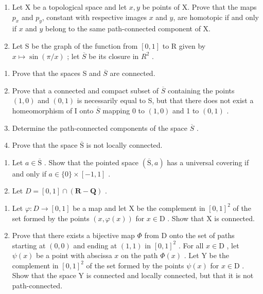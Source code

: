 \exercisegroup

\begin{enumerate}
\def\labelenumi{\arabic{enumi})}
\item
  Let X be a topological space and let \(x, y\) be points of X. Prove that the maps \(p_x\) and \(p_y\), constant with respective images \(x\) and \(y\), are homotopic if and only if \(x\) and \(y\) belong to the same path-connected component of X.
\item
  Let S be the graph of the function from \([0,1]\) to R given by \(x \mapsto \sin(\pi/x)\) ; let \(\overline{S}\) be its closure in \(R^{2}\) .
\end{enumerate}

\begin{enumerate}
\def\labelenumi{\alph{enumi})}
\item
  Prove that the spaces S and \(\overline{S}\) are connected.
\item
  Prove that a connected and compact subset of \(\overline{S}\) containing the points \((1,0)\) and \((0,1)\) is necessarily equal to S, but that there does not exist a homeomorphism of I onto \(\overline{S}\) mapping 0 to \((1,0)\) and 1 to \((0,1)\) .
\item
  Determine the path-connected components of the space \(\overline{S}\) .
\item
  Prove that the space \(\overline{\mathrm{S}}\) is not locally connected.
\end{enumerate}

\begin{enumerate}
\def\labelenumi{\arabic{enumi})}
\setcounter{enumi}{2}
\item
  Let \(a \in \overline{\mathrm{S}}\) . Show that the pointed space \((\overline{\mathrm{S}}, a)\) has a universal covering if and only if \(a \in \{0\} \times [-1, 1]\) .
\item
  Let \(D = [0, 1] \cap (\mathbf{R} - \mathbf{Q})\) .
\end{enumerate}

\begin{enumerate}
\def\labelenumi{\alph{enumi})}
\item
  Let \(\varphi\colon D \to [0,1]\) be a map and let X be the complement in \([0,1]^2\) of the set formed by the points \((x,\varphi(x))\) for \(x\in\mathrm{D}\) . Show that X is connected.
\item
  Prove that there exists a bijective map \(\Phi\) from D onto the set of paths starting at \((0,0)\) and ending at \((1,1)\) in \([0,1]^2\) . For all \(x \in \mathrm{D}\) , let \(\psi(x)\) be a point with abscissa \(x\) on the path \(\Phi(x)\) . Let Y be the complement in \([0,1]^2\) of the set formed by the points \(\psi(x)\) for \(x \in \mathrm{D}\) . Show that the space Y is connected and locally connected, but that it is not path-connected.
\end{enumerate}

